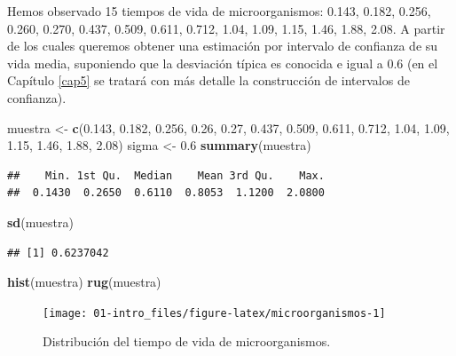 \documentclass[]{book}
\newenvironment{Shaded}{\begin{snugshade}}{\end{snugshade}}
\newcommand{\KeywordTok}[1]{\textcolor[rgb]{0.13,0.29,0.53}{\textbf{#1}}}
\newcommand{\FloatTok}[1]{\textcolor[rgb]{0.00,0.00,0.81}{#1}}
\newcommand{\StringTok}[1]{\textcolor[rgb]{0.31,0.60,0.02}{#1}}
\newcommand{\NormalTok}[1]{#1}
\theoremstyle{definition}
\theoremstyle{definition}
\theoremstyle{definition}
\theoremstyle{remark}
\begin{document}
Hemos observado 15 tiempos de vida de microorganismos: 0.143, 0.182,
0.256, 0.260, 0.270, 0.437, 0.509, 0.611, 0.712, 1.04, 1.09, 1.15, 1.46,
1.88, 2.08. A partir de los cuales queremos obtener una estimación por
intervalo de confianza de su vida media, suponiendo que la desviación
típica es conocida e igual a 0.6 (en el Capítulo \ref{cap5} se tratará
con más detalle la construcción de intervalos de confianza).

\begin{Shaded}
\begin{Highlighting}[]
\NormalTok{muestra <-}\StringTok{ }\KeywordTok{c}\NormalTok{(}\FloatTok{0.143}\NormalTok{, }\FloatTok{0.182}\NormalTok{, }\FloatTok{0.256}\NormalTok{, }\FloatTok{0.26}\NormalTok{, }\FloatTok{0.27}\NormalTok{, }\FloatTok{0.437}\NormalTok{, }\FloatTok{0.509}\NormalTok{, }
    \FloatTok{0.611}\NormalTok{, }\FloatTok{0.712}\NormalTok{, }\FloatTok{1.04}\NormalTok{, }\FloatTok{1.09}\NormalTok{, }\FloatTok{1.15}\NormalTok{, }\FloatTok{1.46}\NormalTok{, }\FloatTok{1.88}\NormalTok{, }\FloatTok{2.08}\NormalTok{)}
\NormalTok{sigma <-}\StringTok{ }\FloatTok{0.6}
\KeywordTok{summary}\NormalTok{(muestra)}
\end{Highlighting}
\end{Shaded}

\begin{verbatim}
##    Min. 1st Qu.  Median    Mean 3rd Qu.    Max. 
##  0.1430  0.2650  0.6110  0.8053  1.1200  2.0800
\end{verbatim}

\begin{Shaded}
\begin{Highlighting}[]
\KeywordTok{sd}\NormalTok{(muestra)}
\end{Highlighting}
\end{Shaded}

\begin{verbatim}
## [1] 0.6237042
\end{verbatim}

\begin{Shaded}
\begin{Highlighting}[]
\KeywordTok{hist}\NormalTok{(muestra)}
\KeywordTok{rug}\NormalTok{(muestra)}
\end{Highlighting}
\end{Shaded}

\begin{figure}[!htb]

{\centering \texttt{[image: 01-intro\_files/figure-latex/microorganismos-1]} 

}

\caption{Distribución del tiempo de vida de microorganismos.}\label{fig:microorganismos}
\end{figure}
\end{document}
